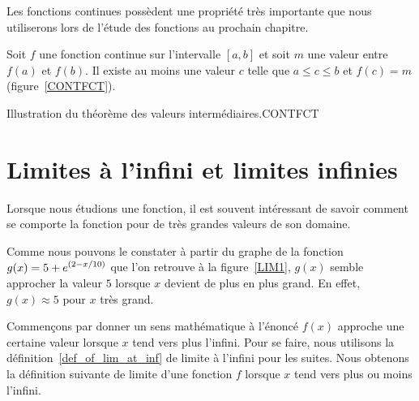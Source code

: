 {

Les fonctions continues possèdent une propriété très importante que
nous utiliserons lors de l'étude des fonctions au prochain chapitre.

\begin{theorem}
Soit $f$ une fonction continue sur l'intervalle $[a,b]$ et soit $m$
une valeur entre $f(a)$ et $f(b)$.  Il existe au moins une valeur $c$
telle que  $a\leq c \leq b$ et $f(c) = m$ (figure~\ref{CONTFCT}).
\label{TVI}
\end{theorem}

{Illustration du théorème des valeurs intermédiaires.}{CONTFCT}

\section{Limites à l'infini et limites infinies}

Lorsque nous étudions une fonction, il est souvent intéressant de savoir
comment se comporte la fonction pour de très grandes valeurs de son
domaine.

\begin{egg}
Comme nous pouvons le constater à partir du graphe de la fonction
$\displaystyle g(x) = 5 + e^{(2 - x/10)}$ que l'on retrouve à la
figure~\ref{LIM1}, $g(x)$ semble approcher la valeur $5$ lorsque $x$
devient de plus en plus grand.  En effet, $g(x) \approx 5$ pour $x$
très grand.
\end{egg}


Commençons par donner un sens mathématique à l'énoncé \lgm $f(x)$
approche une certaine valeur lorsque $x$ tend vers plus l'infini\rgm.
Pour se faire, nous utilisons la définition~\ref{def_of_lim_at_inf} de
limite à l'infini pour les suites.  Nous obtenons la définition suivante
de limite d'une fonction $f$ lorsque $x$ tend vers plus ou moins
l'infini.

}
